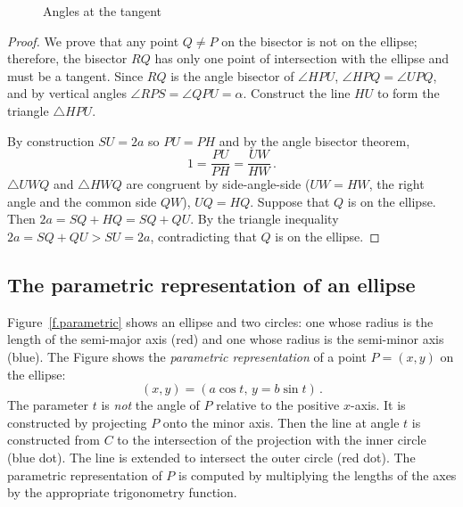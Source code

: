 \begin{figure}[b]
\begin{center}
\caption{Angles at the tangent}\label{f.tangent-angles}
\end{center}
\end{figure}


\begin{proof} 
We prove that any point $Q\neq P$ on the bisector is not on the ellipse; therefore, the bisector $RQ$ has only one point of intersection with the ellipse and must be a tangent. Since $RQ$ is the angle bisector of $\angle HPU$, $\angle HPQ =\angle UPQ$, and by vertical angles $\angle RPS=\angle QPU=\alpha$. Construct the line $HU$ to form the triangle $\triangle HPU$. 

By construction $SU=2a$ so $PU=PH$ and by the angle bisector theorem,
\[
1=\frac{PU}{PH} = \frac{UW}{HW}\,.
\] 
$\triangle UWQ$ and $\triangle HWQ$ are congruent by side-angle-side ($UW=HW$, the right angle and the common side $QW$), $UQ=HQ$. Suppose that $Q$ is on the ellipse. Then $2a=SQ+HQ=SQ+QU$. By the triangle inequality $2a=SQ+QU>SU=2a$, contradicting that $Q$ is on the ellipse.\hqed
\end{proof}


\subsection{The parametric representation of an ellipse}

Figure~\ref{f.parametric} shows an ellipse and two circles: one whose radius is the length of the semi-major axis (red) and one whose radius is the semi-minor axis (blue). The Figure shows the \emph{parametric representation} of a point $P=(x,y)$ on the ellipse:
\[
(x,y)= (a\cos t,\, y = b \sin t)\,.
\]
The parameter $t$ is \emph{not} the angle of $P$ relative to the positive $x$-axis. It is constructed by projecting $P$ onto the minor axis. Then the line at angle $t$ is constructed from $C$ to the intersection of the projection with the inner circle (blue dot). The line is extended to intersect the outer circle (red dot). The parametric representation of $P$ is computed by multiplying the lengths of the axes by the appropriate trigonometry function.

